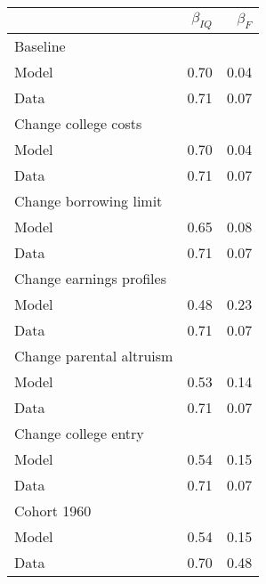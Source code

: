 \begin{tabular}{lrr}
\hline
  & $\beta_{IQ}$  & $\beta_{F}$  \\ 
\hline
Baseline &   &   \\ 
Model & 0.70  & 0.04  \\ 
Data & 0.71  & 0.07  \\ 
Change college costs &   &   \\ 
Model & 0.70  & 0.04  \\ 
Data & 0.71  & 0.07  \\ 
Change borrowing limit &   &   \\ 
Model & 0.65  & 0.08  \\ 
Data & 0.71  & 0.07  \\ 
Change earnings profiles &   &   \\ 
Model & 0.48  & 0.23  \\ 
Data & 0.71  & 0.07  \\ 
Change parental altruism &   &   \\ 
Model & 0.53  & 0.14  \\ 
Data & 0.71  & 0.07  \\ 
Change college entry &   &   \\ 
Model & 0.54  & 0.15  \\ 
Data & 0.71  & 0.07  \\ 
Cohort 1960 &   &   \\ 
Model & 0.54  & 0.15  \\ 
Data & 0.70  & 0.48  \\ 
\hline
\end{tabular}%
